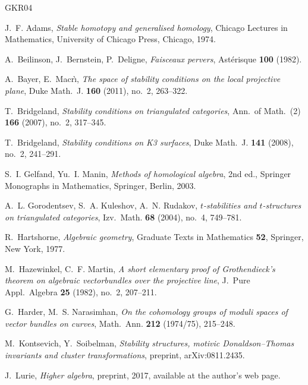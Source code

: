 \documentclass[12pt]{amsart}
\numberwithin{theorem}{section}
\theoremstyle{definition}
\begin{document}
	\begin{thebibliography}{GKR04}
		
		J.~F. Adams,
		\emph{Stable homotopy and generalised homology},
		Chicago Lectures in Mathematics, University of Chicago Press, Chicago, 1974.
		
		A.~Beilinson, J.~Bernstein, P.~Deligne,
		\emph{Faisceaux pervers},
		Ast\'erisque \textbf{100} (1982).
		
		A.~Bayer, E.~Macr\`\i,
		\emph{The space of stability conditions on the local projective plane},
		Duke Math.\ J. \textbf{160} (2011), no.~2, 263--322.
		
		T.~Bridgeland,
		\emph{Stability conditions on triangulated categories},
		Ann.\ of Math.\ (2) \textbf{166} (2007), no.~2, 317--345.
		
		T.~Bridgeland,
		\emph{Stability conditions on K3 surfaces},
		Duke Math.\ J. \textbf{141} (2008), no.~2, 241--291.
		
		S.~I. Gelfand, Yu.~I. Manin,
		\emph{Methods of homological algebra}, 2nd ed.,
		Springer Monographs in Mathematics, Springer, Berlin, 2003.
		
		A.~L. Gorodentsev, S.~A. Kuleshov, A.~N. Rudakov,
		\emph{$t$-stabilities and $t$-structures on triangulated categories},
		Izv.\ Math. \textbf{68} (2004), no.~4, 749--781.
		
		R.~Hartshorne,
		\emph{Algebraic geometry},
		Graduate Texts in Mathematics \textbf{52}, Springer, New York, 1977.
		
		M.~Hazewinkel, C.~F. Martin,
		\emph{A short elementary proof of Grothendieck's theorem on algebraic vectorbundles over the projective line},
		J.\ Pure Appl.\ Algebra \textbf{25} (1982), no.~2, 207--211.
		
		G.~Harder, M.~S. Narasimhan,
		\emph{On the cohomology groups of moduli spaces of vector bundles on curves},
		Math.\ Ann. \textbf{212} (1974/75), 215--248.
		
		M.~Kontsevich, Y.~Soibelman,
		\emph{Stability structures, motivic Donaldson--Thomas invariants and cluster transformations},
		preprint, arXiv:0811.2435.
		
		J.~Lurie,
		\emph{Higher algebra},
		preprint, 2017, available at the author's web page.
		

\end{thebibliography}
\end{document}
